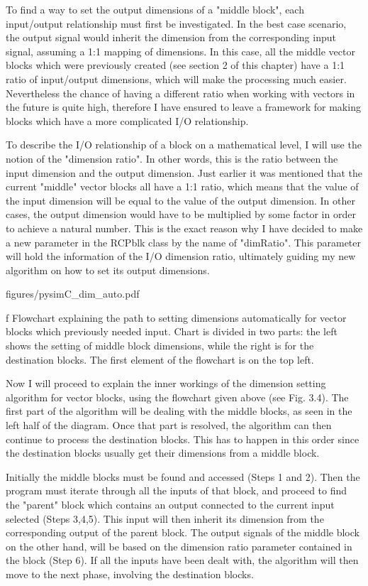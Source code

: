 \quad To find a way to set the output dimensions of a "middle block", each input/output relationship
must first be investigated. In the best case scenario, the output signal would inherit the dimension from
the corresponding input signal, assuming a 1:1 mapping of dimensions. In this case, all the middle vector
blocks which were previously created (see section 2 of this chapter) have a 1:1 ratio of input/output
dimensions, which will make the processing much easier. Nevertheless the chance of having a different
ratio when working with vectors in the future is quite high, therefore I have ensured to leave a framework
for making blocks which have a more complicated I/O relationship. 

\quad To describe the I/O relationship of a block on a mathematical level, I will use the notion of the
"dimension ratio". In other words, this is the ratio between the input dimension and the output dimension.
Just earlier it was mentioned that the current "middle" vector blocks all have a 1:1 ratio, which means that
the value of the input dimension will be equal to the value of the output dimension. In other cases, the
output dimension would have to be multiplied by some factor in order to achieve a natural number. This is
the exact reason why I have decided to make a new parameter in the RCPblk class by the name of "dimRatio".
This parameter will hold the information of the I/O dimension ratio, ultimately guiding my new algorithm on
how to set its output dimensions. 

\medskip {}
\picw=13cm \cinspic figures/pysimC_dim_auto.pdf
\caption/f Flowchart explaining the path to setting dimensions automatically for vector blocks which
previously needed input. Chart is divided in two parts: the left shows the setting of middle block dimensions,
while the right is for the destination blocks. The first element of the flowchart is on the top left.
\medskip

\quad Now I will proceed to explain the inner workings of the dimension setting algorithm for vector blocks,
using the flowchart given above (see Fig. 3.4). The first part of the algorithm will be dealing with the
middle blocks, as seen in the left half of the diagram. Once that part is resolved, the algorithm can then
continue to process the destination blocks. This has to happen in this order since the destination blocks
usually get their dimensions from a middle block. 

\quad Initially the middle blocks must be found and accessed (Steps 1 and 2). Then the program must iterate
through all the inputs of that block, and proceed to find the "parent" block which contains an output
connected to the current input selected (Steps 3,4,5). This input will then inherit its dimension from the
corresponding output of the parent block. The output signals of the middle block on the other hand,
will be based on the dimension ratio parameter contained in the block (Step 6). If all the inputs have been
dealt with, the algorithm will then move to the next phase, involving the destination blocks.

